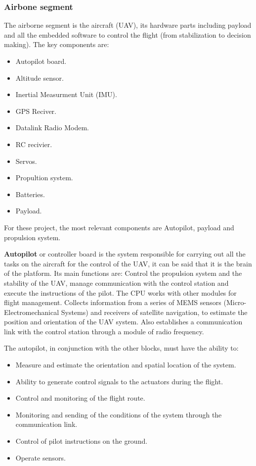\subsubsection{Airbone segment}
The airborne segment is the aircraft (UAV), its hardware parts including payload and all the embedded software to control the flight (from stabilization to decision making). The key components are:
\begin{itemize}
    \item Autopilot board.
    \item Altitude sensor.
    \item Inertial Measurment Unit (IMU).
    \item GPS Reciver.
    \item Datalink Radio Modem.
    \item RC recivier.
    \item Servos.
    \item Propultion system.
    \item Batteries.
    \item Payload.
\end{itemize}
For these project, the most relevant components are Autopilot, payload and propulsion system.

\textbf{ Autopilot} or controller board is the system responsible for carrying out all the tasks on the aircraft for the control of the UAV, it can be said that it is the brain of the platform. Its main functions are: Control the propulsion system and the stability of the UAV, manage communication with the control station and execute the instructions of the pilot. The CPU works with other modules for flight management. Collects information from a series of MEMS sensors (Micro-Electromechanical Systems) and receivers of satellite navigation, to estimate the position and orientation of the UAV system. Also establishes a communication link with the control station through a module of radio frequency.\cite{Edgar}

The autopilot, in conjunction with the other blocks, must have the ability to:
\begin{itemize}
    \item Measure and estimate the orientation and spatial location of the system.
    \item Ability to generate control signals to the actuators during the flight.
    \item Control and monitoring of the flight route.
    \item Monitoring and sending of the conditions of the system through the communication link.
    \item Control of pilot instructions on the ground.
    \item Operate sensors.
\end{itemize}

